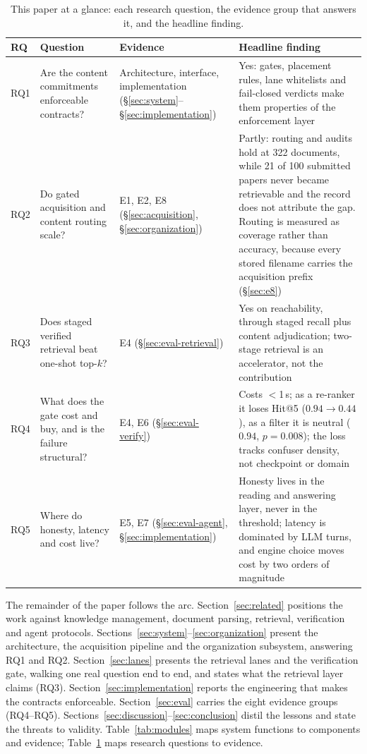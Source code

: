 \begin{table}[t]
\centering
\footnotesize
\setlength{\tabcolsep}{3pt}
\caption{This paper at a glance: each research question, the evidence group
that answers it, and the headline finding.}
\label{tab:ataglance}
\begin{tabular}{p{0.8cm}p{3.7cm}p{2.9cm}p{4.9cm}}
\toprule
RQ & Question & Evidence & Headline finding \\
\midrule
RQ1 & Are the content commitments enforceable contracts? &
Architecture, interface, implementation
(\S\ref{sec:system}--\S\ref{sec:implementation}) & Yes: gates, placement
rules, lane whitelists and fail-closed verdicts make them properties of the
enforcement layer \\
RQ2 & Do gated acquisition and content routing scale? &
E1, E2, E8 (\S\ref{sec:acquisition}, \S\ref{sec:organization}) & Partly: routing
and audits hold at 322 documents, while 21 of 100 submitted papers never
became retrievable and the record does not attribute the gap. Routing is
measured as coverage rather than accuracy, because every stored filename
carries the acquisition prefix (\S\ref{sec:e8}) \\
RQ3 & Does staged verified retrieval beat one-shot top-$k$? &
E4 (\S\ref{sec:eval-retrieval}) & Yes on reachability, through staged
recall plus content adjudication; two-stage retrieval is an accelerator, not
the contribution \\
RQ4 & What does the gate cost and buy, and is the failure structural? &
E4, E6 (\S\ref{sec:eval-verify}) & Costs $<$1\,s; as a re-ranker it loses
Hit@5 ($0.94\!\to\!0.44$), as a filter it is neutral ($0.94$,
$p=0.008$); the loss tracks confuser density, not checkpoint or domain \\
RQ5 & Where do honesty, latency and cost live? &
E5, E7 (\S\ref{sec:eval-agent}, \S\ref{sec:implementation}) & Honesty lives
in the reading and answering layer, never in the threshold; latency is
dominated by LLM turns, and engine choice moves cost by two orders of
magnitude \\
\bottomrule
\end{tabular}
\end{table}

The remainder of the paper follows the arc.
Section~\ref{sec:related} positions the work against knowledge management,
document parsing, retrieval, verification and agent protocols.
Sections~\ref{sec:system}--\ref{sec:organization} present the architecture,
the acquisition pipeline and the organization subsystem, answering RQ1 and
RQ2. Section~\ref{sec:lanes} presents the retrieval lanes and the verification
gate, walking one real question end to end, and states what the retrieval layer
claims (RQ3). Section~\ref{sec:implementation} reports the engineering that
makes the contracts enforceable. Section~\ref{sec:eval} carries the eight
evidence groups (RQ4--RQ5).
Sections~\ref{sec:discussion}--\ref{sec:conclusion} distil the lessons and
state the threats to validity. Table~\ref{tab:modules} maps system functions
to components and evidence; Table~\ref{tab:ataglance} maps research questions
to evidence.
